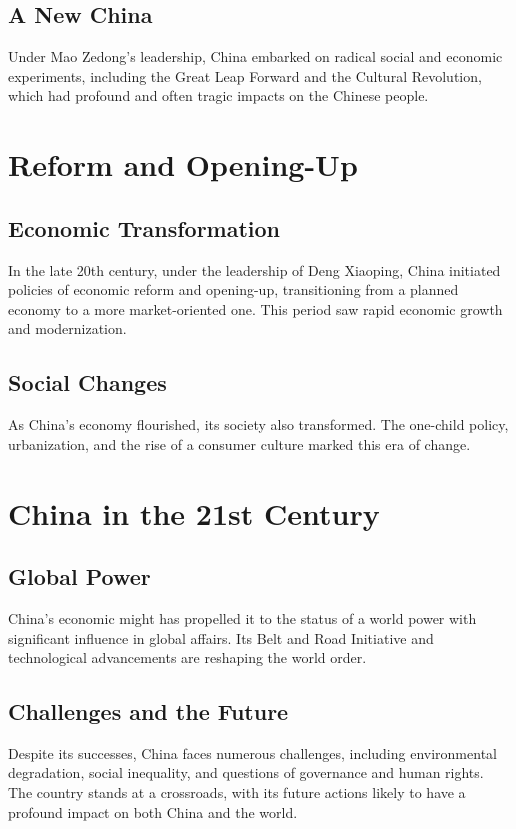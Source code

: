 \documentclass{book}
\begin{document}
\subsection{A New China}
Under Mao Zedong's leadership, China embarked on radical social and economic experiments, including the Great Leap Forward and the Cultural Revolution, which had profound and often tragic impacts on the Chinese people.

\section{Reform and Opening-Up}
\label{sec:reform-opening-up}
\subsection{Economic Transformation}
In the late 20th century, under the leadership of Deng Xiaoping, China initiated policies of economic reform and opening-up, transitioning from a planned economy to a more market-oriented one. This period saw rapid economic growth and modernization.

\subsection{Social Changes}
As China's economy flourished, its society also transformed. The one-child policy, urbanization, and the rise of a consumer culture marked this era of change.

\section{China in the 21st Century}
\label{sec:china-21st-century}
\subsection{Global Power}
China's economic might has propelled it to the status of a world power with significant influence in global affairs. Its Belt and Road Initiative and technological advancements are reshaping the world order.

\subsection{Challenges and the Future}
Despite its successes, China faces numerous challenges, including environmental degradation, social inequality, and questions of governance and human rights. The country stands at a crossroads, with its future actions likely to have a profound impact on both China and the world.
\end{document}
